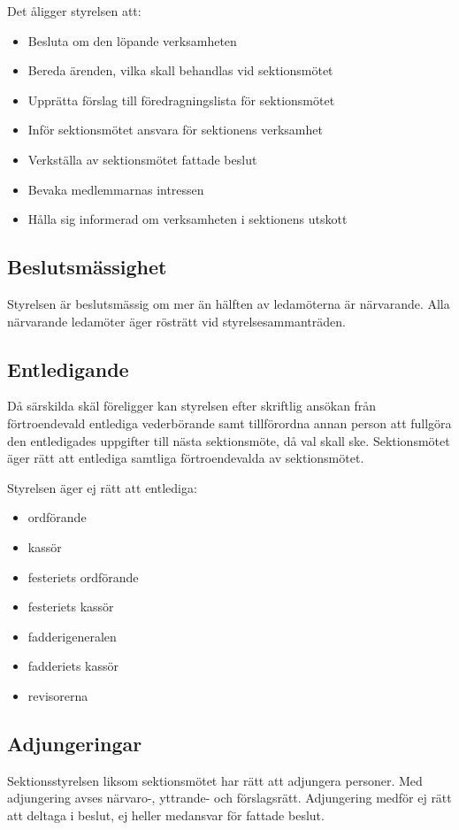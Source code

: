 \documentclass{datateknologsektionen-document}
\begin{document}
      Det åligger styrelsen att:
      \begin{itemize}
        \item Besluta om den löpande verksamheten
        \item Bereda ärenden, vilka skall behandlas vid sektionsmötet
        \item Upprätta förslag till föredragningslista för sektionsmötet
        \item Inför sektionsmötet ansvara för sektionens verksamhet
        \item Verkställa av sektionsmötet fattade beslut
        \item Bevaka medlemmarnas intressen
        \item Hålla sig informerad om verksamheten i sektionens utskott
      \end{itemize}
    \subsection{Beslutsmässighet}
      Styrelsen är beslutsmässig om mer än hälften av ledamöterna är närvarande. Alla
      närvarande ledamöter äger rösträtt vid styrelsesammanträden.
    \subsection{Entledigande}
      Då särskilda skäl föreligger kan styrelsen efter skriftlig ansökan från förtroendevald
      entlediga vederbörande samt tillförordna annan person att fullgöra den entledigades
      uppgifter till nästa sektionsmöte, då val skall ske. Sektionsmötet äger rätt att entlediga
      samtliga förtroendevalda av sektionsmötet.

      Styrelsen äger ej rätt att entlediga:
      \begin{itemize}
        \item ordförande
        \item kassör
        \item festeriets ordförande
        \item festeriets kassör
        \item fadderigeneralen
        \item fadderiets kassör
        \item revisorerna
      \end{itemize}
    \subsection{Adjungeringar}
      Sektionsstyrelsen liksom sektionsmötet har rätt att adjungera personer. Med adjungering
      avses närvaro-, yttrande- och förslagsrätt. Adjungering medför ej rätt att deltaga i beslut,
      ej heller medansvar för fattade beslut.
\end{document}
